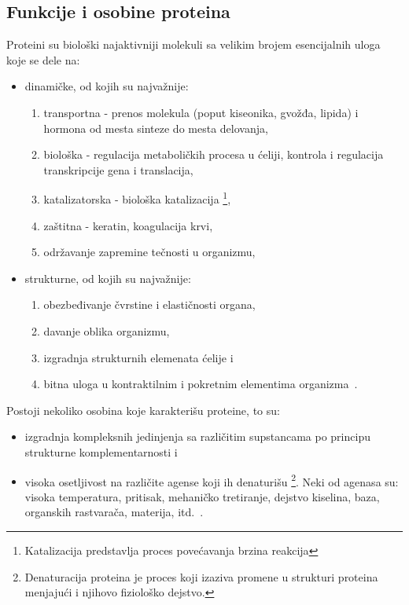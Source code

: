 \subsection{Funkcije i osobine proteina}
Proteini su biološki najaktivniji molekuli sa velikim brojem esencijalnih uloga koje se dele na:
\begin{itemize}
\item dinamičke, od kojih su najvažnije:
\begin{enumerate} 
\item transportna - prenos molekula (poput kiseonika, gvožđa, lipida) i hormona od mesta sinteze do mesta delovanja,
\item biološka - regulacija metaboličkih procesa u ćeliji, kontrola i regulacija transkripcije gena i translacija,
\item katalizatorska - biološka katalizacija \footnote{Katalizacija predstavlja proces povećavanja brzina reakcija},
\item zaštitna - keratin, koagulacija krvi,
\item održavanje zapremine tečnosti u organizmu,
\end{enumerate}
\item strukturne, od kojih su najvažnije:
\begin{enumerate}
\item obezbeđivanje čvrstine i elastičnosti organa,
\item davanje oblika organizmu,
\item izgradnja strukturnih elemenata ćelije i
\item bitna uloga u kontraktilnim i pokretnim elementima organizma~\cite{spasic}.
\end{enumerate}
\end{itemize} 

Postoji nekoliko osobina koje karakterišu proteine, to su:
\begin{itemize}
\item izgradnja kompleksnih jedinjenja sa različitim supstancama po principu strukturne komplementarnosti i  
\item visoka osetljivost na različite agense koji ih denaturišu \footnote{Denaturacija proteina je proces koji izaziva promene u strukturi proteina menjajući i njihovo fiziološko dejstvo.}. Neki od agenasa su: visoka temperatura, pritisak, mehaničko tretiranje, dejstvo kiselina, baza, organskih rastvarača, materija, itd.~\cite{spasic}.
\end{itemize}
 
